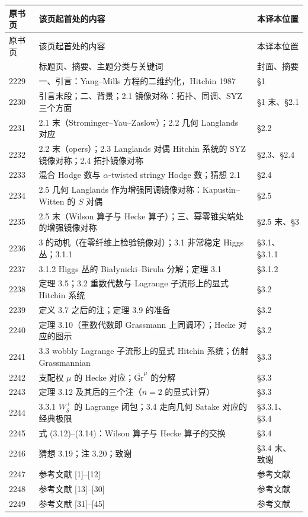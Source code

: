 \begin{longtable}{p{1.5cm}p{8.4cm}p{4.3cm}}
\toprule
原书页 & 该页起首处的内容 & 本译本位置\\
\midrule
\endfirsthead
\toprule
原书页 & 该页起首处的内容 & 本译本位置\\
\midrule
\endhead
\bottomrule
\endfoot
2228 & 标题页、摘要、主题分类与关键词 & 封面、摘要\\
2229 & 一、引言：Yang--Mills 方程的二维约化，Hitchin 1987 & \S1\\
2230 & 引言末段；二、背景；2.1 镜像对称：拓扑、同调、SYZ 三个方面 & \S1 末、\S2.1\\
2231 & 2.1 末（Strominger--Yau--Zaslow）；2.2 几何 Langlands 对应 & \S2.2\\
2232 & 2.2 末（opers）；2.3 Langlands 对偶 Hitchin 系统的 SYZ 镜像对称；2.4 拓扑镜像对称 & \S2.3、\S2.4\\
2233 & 混合 Hodge 数与 $\alpha$-twisted stringy Hodge 数；猜想 2.1 & \S2.4\\
2234 & 2.5 几何 Langlands 作为增强同调镜像对称：Kapustin--Witten 的 $S$ 对偶 & \S2.5\\
2235 & 2.5 末（Wilson 算子与 Hecke 算子）；三、幂零锥尖端处的增强镜像对称 & \S2.5 末、\S3\\
2236 & 3 的动机（在零纤维上检验镜像对）；3.1 非常稳定 Higgs 丛；3.1.1 & \S3.1、\S3.1.1\\
2237 & 3.1.2 Higgs 丛的 Białynicki--Birula 分解；定理 3.1 & \S3.1.2\\
2238 & 定理 3.5；3.2 重数代数与 Lagrange 子流形上的显式 Hitchin 系统 & \S3.2\\
2239 & 定义 3.7 之后的注；定理 3.9 的准备 & \S3.2\\
2240 & 定理 3.10（重数代数即 Grassmann 上同调环）；Hecke 对应的图示 & \S3.2\\
2241 & 3.3 wobbly Lagrange 子流形上的显式 Hitchin 系统；仿射 Grassmannian & \S3.3\\
2242 & 支配权 $\mu$ 的 Hecke 对应；$\overline{\mathrm{Gr}}^{\mu}$ 的分解 & \S3.3\\
2243 & 定理 3.12 及其后的三个注（$n=2$ 的显式计算） & \S3.3\\
2244 & 3.3.1 $W^{+}_{\delta}$ 的 Lagrange 闭包；3.4 走向几何 Satake 对应的经典极限 & \S3.3.1、\S3.4\\
2245 & 式 (3.12)--(3.14)：Wilson 算子与 Hecke 算子的交换 & \S3.4\\
2246 & 猜想 3.19；注 3.20；致谢 & \S3.4 末、致谢\\
2247 & 参考文献 [1]--[12] & 参考文献\\
2248 & 参考文献 [13]--[30] & 参考文献\\
2249 & 参考文献 [31]--[45] & 参考文献\\
\end{longtable}

\newpage
\tableofcontents
\newpage
